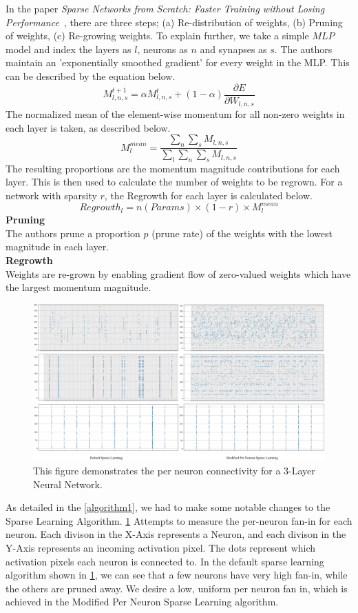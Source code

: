 In the paper \textit{Sparse Networks from Scratch: Faster Training without Losing Performance}~\cite{dettmers2019sparse}, there are three steps; (a) Re-distribution of weights, (b) Pruning of weights, (c) Re-growing weights. To explain further, we take a simple $MLP$ model and index the layers as $l$, neurons as $n$ and synapses as $s$. The authors maintain an 'exponentially smoothed gradient' for every weight in the MLP. This can be described by the equation below.
$$
M_{l, n, s}^{t+1} = \alpha M_{l, n, s}^{t} + (1 - \alpha) \frac{\partial E}{\partial W_{l, n, s}}
$$
The normalized mean of the element-wise momentum for all non-zero weights in each layer is taken, as described below.
$$
M^{mean}_{l} = \frac{\sum_{n}\sum_{s} M_{l, n, s}}{\sum_{l}\sum_{n}\sum_{s} M_{l, n, s}}
$$
The resulting proportions are the momentum magnitude contributions for each layer. This is then used to calculate the number of weights to be regrown. For a network with sparsity $r$, the Regrowth for each layer is calculated below.
$$
Regrowth_{l} = n(Params)\times(1-r)\times M^{mean}_{l}
$$
\textbf{Pruning}\\
The authors prune a proportion $p$ (prune rate) of the weights with the lowest magnitude in each layer.\\
\textbf{Regrowth}\\
Weights are re-grown by enabling gradient flow of zero-valued weights which have the largest momentum magnitude.
\begin{figure}
    \centering
    \includegraphics[width=450pt]{figures/bison/neuronsparsity.png}
    \caption{This figure demonstrates the per neuron connectivity for a 3-Layer Neural Network.}
    \label{neuronsparsity}
\end{figure}
As detailed in the \cref{algorithm1}, we had to make some notable changes to the Sparse Learning Algorithm. \cref{neuronsparsity} Attempts to measure the per-neuron fan-in for each neuron. Each divison in the X-Axis represents a Neuron, and each divison in the Y-Axis represents an incoming activation pixel. The dots represent which activation pixels each neuron is connected to. In the default sparse learning algorithm shown in \cref{neuronsparsity}, we can see that a few neurons have very high fan-in, while the others are pruned away. We desire a low, uniform per neuron fan in, which is achieved in the Modified Per Neuron Sparse Learning algorithm. 

